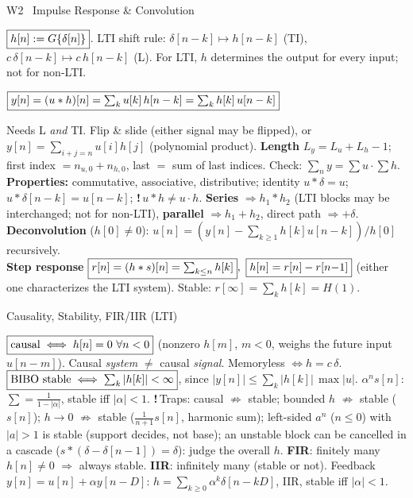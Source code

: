 \documentclass[a4paper,landscape]{article}
\newcommand{\sect}[1]{\par\vspace{1pt}\noindent\colorbox{secblue}{\parbox{\dimexpr\linewidth-2\fboxsep}{\color{white}\bfseries\fontsize{6.8}{7.6}\selectfont\strut #1}}\par\vspace{0.4pt}}
\newcommand{\sub}[1]{\par\vspace{0.6pt}\noindent\colorbox{subblue}{\parbox{\dimexpr\linewidth-2\fboxsep}{\bfseries\strut #1}}\par\vspace{0.2pt}}
\newcommand{\warn}[1]{{\color{warnred}\textbf{!}\,#1}}
\newcommand{\bx}[1]{\fbox{$\textstyle #1$}}
\newcommand{\eqc}[1]{\par\vspace{0.2pt}\centerline{$#1$}\par\vspace{0.2pt}}
\begin{document}
\begin{multicols*}{4}
\sect{W2 \ Impulse Response \& Convolution}
$\bx{h[n]:=G\{\delta[n]\}}$. LTI shift rule: $\delta[n{-}k]\mapsto h[n{-}k]$ (TI), $c\,\delta[n{-}k]\mapsto c\,h[n{-}k]$ (L). For LTI, $h$ determines the output for every input; not for non-LTI.
\eqc{\bx{y[n]=(u*h)[n]=\textstyle\sum_ku[k]\,h[n-k]=\sum_kh[k]\,u[n-k]}}
Needs L \emph{and} TI. Flip \& slide (either signal may be flipped), or $y[n]=\sum_{i+j=n}u[i]h[j]$ (polynomial product). \textbf{Length} $L_y=L_u+L_h-1$; first index $=n_{u,0}+n_{h,0}$, last $=$ sum of last indices. Check: $\sum_ny=\sum u\cdot\sum h$.\\
\textbf{Properties:} commutative, associative, distributive; identity $u*\delta=u$; $u*\delta[n{-}k]=u[n{-}k]$; \warn{$u*h\ne u\cdot h$}. \textbf{Series} $\Rightarrow h_1*h_2$ (LTI blocks may be interchanged; not for non-LTI), \textbf{parallel} $\Rightarrow h_1+h_2$, direct path $\Rightarrow+\delta$.
\textbf{Deconvolution} ($h[0]{\ne}0$): $u[n]=(y[n]-\sum_{k\ge1}h[k]u[n{-}k])/h[0]$ recursively.\\
\textbf{Step response} $\bx{r[n]=(h*s)[n]=\sum_{k\le n}h[k]},\ \bx{h[n]=r[n]-r[n{-}1]}$ (either one characterizes the LTI system). Stable: $r[\infty]=\sum_kh[k]=H(1)$.
\sub{Causality, Stability, FIR/IIR (LTI)}
$\bx{\text{causal}\iff h[n]=0\ \forall n<0}$ (nonzero $h[m]$, $m{<}0$, weighs the future input $u[n{-}m]$). Causal \emph{system} $\ne$ causal \emph{signal}. Memoryless $\iff h=c\,\delta$.
$\bx{\text{BIBO stable}\iff\sum_k|h[k]|<\infty}$, since $|y[n]|\le\sum_k|h[k]|\,\max|u|$. $\alpha^ns[n]$: $\sum=\frac1{1-|\alpha|}$, stable iff $|\alpha|{<}1$.
\warn{Traps:} causal $\not\Rightarrow$ stable; bounded $h$ $\not\Rightarrow$ stable ($s[n]$); $h\to0$ $\not\Rightarrow$ stable ($\frac1{n+1}s[n]$, harmonic sum); left-sided $a^n$ ($n{\le}0$) with $|a|{>}1$ is stable (support decides, not base); an unstable block can be cancelled in a cascade ($s*(\delta-\delta[n{-}1])=\delta$): judge the overall $h$.
\textbf{FIR}: finitely many $h[n]{\ne}0$ $\Rightarrow$ always stable. \textbf{IIR}: infinitely many (stable or not).
Feedback $y[n]=u[n]+\alpha y[n{-}D]$: $h=\sum_{k\ge0}\alpha^k\delta[n{-}kD]$, IIR, stable iff $|\alpha|{<}1$.


\end{multicols*}
\end{document}
